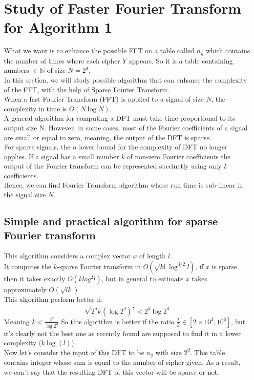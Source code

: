 \documentclass{article}
\begin{document}
\section{Study of Faster Fourier Transform for Algorithm 1}
What we want is to enhance the possible FFT on a table called $n_y$ which contains the number of times where each cipher $Y$ appears. So it is a table containing numbers $\in \mathbb{N}$ of size $N=2^d$.\\
In this section, we will study possible algorithm that can enhance the complexity of the FFT, with the help of Sparse Fourier Transform.\\
When a fast Fourier Transform (FFT) is applied to a signal of size $N$, the complexity in time is $O(N\log N)$.\\
A general algorithm for computing a DFT must take time proportional to its output size N. However, in some cases, most of the Fourier coefficients of a signal are small or equal to zero, meaning, the output of the DFT is sparse.\\
For sparse signals, the $n$ lower bound for the complexity of DFT no longer applies. If a signal has a small number $k$ of non-zero Fourier coefficients the output of the Fourier transform can be represented succinctly using only $k$ coefficients.\\
Hence, we can find Fourier Transform algorithm whose run time is sub-linear in the signal size $N$.\\


\subsection{Simple and practical algorithm for sparse Fourier transform}
This algorithm considers a complex vector $x$ of length $l$.\\
It computes the $k$-sparse Fourier transform in $O(\sqrt{kl}\log^{3/2}l)$, if $x$ is sparse then it takes exactly $O(klog^{2}l)$, but in general to estimate $x$ takes approximately $O(\sqrt{lk})$\\
This algorithm perform better if:
$$\sqrt{2^d k}(\log2^d)^\frac{3}{2} < 2^d \log2^d$$
Meaning $k<\frac{2^d}{\log 2^d}$
So this algorithm is better if the ratio $\frac{l}{k} \in [2 \times 10^3, 10^6]$, but it's clearly not the best one as recently found are supposed to find it in a lower complexity ($k\log(l)$).\\
Now let's consider the input of this DFT to be $n_y$ with size $2^d$. This table contains integer whose sum is equal to the number of cipher given. As a result, we can't say that the resulting DFT of this vector will be sparse or not.
\end{document}
